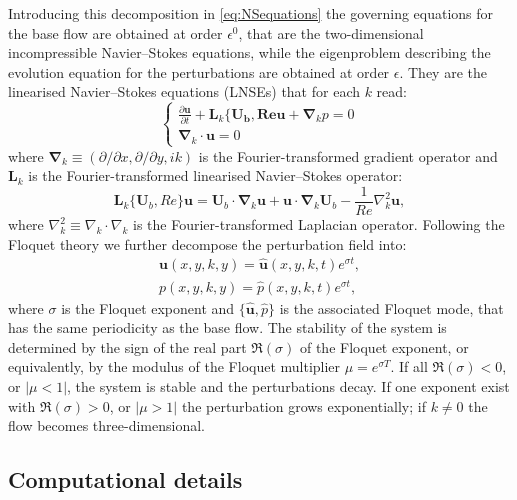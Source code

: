 \documentclass[onecolumn,notitlepage,superscriptaddress, amsmath,amssymb,longbibliographyaps,floatfix]{revtex4-1}
\begin{document}
Introducing this decomposition in \ref{eq:NSequations} the governing equations for the base flow are obtained at order $\epsilon^0$, that are the two-dimensional incompressible Navier--Stokes equations, while the eigenproblem describing the evolution equation for the perturbations are obtained at order $\epsilon$. They are the linearised Navier--Stokes equations (LNSEs) that for each $k$ read:
%
\begin{equation}
\begin{cases}
\frac{\partial \bm{u}}{\partial t} + \bm{L}_k\{\bm{U_b,Re}\bm{u} + \bm{\nabla}_k p = 0 \\
\bm{\nabla}_k \cdot \bm{u} = 0
\end{cases}
\label{eq:LNSEs}
\end{equation}
%
where $\bm{\nabla}_k \equiv (\partial / \partial x,\partial / \partial y, ik)$ is the Fourier-transformed gradient operator and $\bm{L}_k$ is the Fourier-transformed linearised Navier--Stokes operator:
%
\begin{equation}
\bm{L}_k\{\bm{U}_b,Re\}\bm{u}=\bm{U}_b \cdot \bm{\nabla}_k \bm{u} + \bm{u} \cdot \bm{\nabla}_k \bm{U}_b - \frac{1}{Re} \nabla^2_k \bm{u},
\end{equation}
%
where $\nabla^2_k \equiv \nabla_k \cdot \nabla_k$ is the Fourier-transformed Laplacian operator. Following the Floquet theory we further decompose the perturbation field into:
%
\begin{equation}
\begin{gathered}
\bm{u}(x,y,k,y) = \hat{\bm{u}}(x,y,k,t) e^{\sigma t}, \\
    p (x,y,k,y) = \hat{    p }(x,y,k,t) e^{\sigma t},
\end{gathered}
\end{equation}
%
where $\sigma$ is the Floquet exponent and $\{ \hat{\bm{u}},\hat{p} \}$ is the associated Floquet mode, that has the same periodicity as the base flow. The stability of the system is determined by the sign of the real part $\Re(\sigma)$ of the Floquet exponent, or equivalently, by the modulus of the Floquet multiplier $\mu = e^{\sigma T}$. If all $\Re(\sigma)<0$, or $|\mu<1|$, the system is stable and the perturbations decay. If one exponent exist with $\Re(\sigma)>0$, or $|\mu>1|$ the perturbation grows exponentially; if $k \neq 0$ the flow becomes three-dimensional.

\subsection{Computational details}
\end{document}

